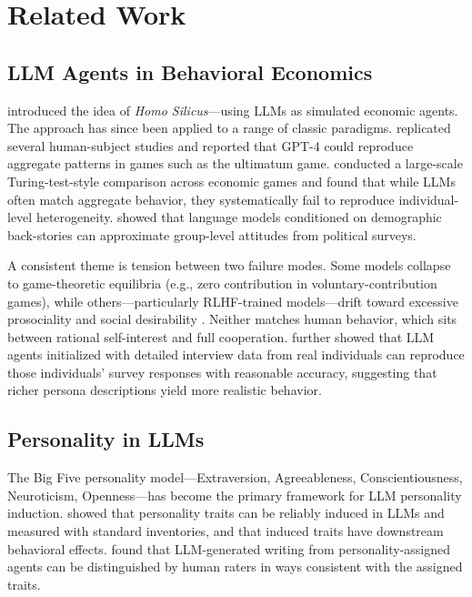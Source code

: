 \documentclass[12pt, a4paper]{article}
\begin{document}
\section{Related Work}

\subsection{LLM Agents in Behavioral Economics}

\citet{horton2023homo} introduced the idea of \emph{Homo Silicus}---using LLMs as simulated economic agents. The approach has since been applied to a range of classic paradigms. \citet{aher2023turing} replicated several human-subject studies and reported that GPT-4 could reproduce aggregate patterns in games such as the ultimatum game. \citet{mei2024turing} conducted a large-scale Turing-test-style comparison across economic games and found that while LLMs often match aggregate behavior, they systematically fail to reproduce individual-level heterogeneity. \citet{argyle2023out} showed that language models conditioned on demographic back-stories can approximate group-level attitudes from political surveys.

A consistent theme is tension between two failure modes. Some models collapse to game-theoretic equilibria (e.g., zero contribution in voluntary-contribution games), while others---particularly RLHF-trained models---drift toward excessive prosociality and social desirability \citep{salecha2024social}. Neither matches human behavior, which sits between rational self-interest and full cooperation. \citet{park2024generative} further showed that LLM agents initialized with detailed interview data from real individuals can reproduce those individuals' survey responses with reasonable accuracy, suggesting that richer persona descriptions yield more realistic behavior.

\subsection{Personality in LLMs}

The Big Five personality model---Extraversion, Agreeableness, Conscientiousness, Neuroticism, Openness---has become the primary framework for LLM personality induction. \citet{serapio2023personality} showed that personality traits can be reliably induced in LLMs and measured with standard inventories, and that induced traits have downstream behavioral effects. \citet{jiang2024personallm} found that LLM-generated writing from personality-assigned agents can be distinguished by human raters in ways consistent with the assigned traits.
\end{document}
